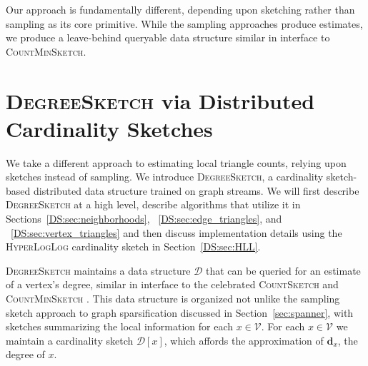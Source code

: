 \documentclass[10]{report}
\newcommand{\algoname}[1]{\textnormal{\textsc{#1}}}
\begin{document}
Our approach is fundamentally different, depending upon sketching rather than sampling as its core primitive. 
While the sampling approaches produce estimates, we produce a leave-behind queryable data structure similar in interface to \algoname{CountMinSketch}.


\section{\algoname{DegreeSketch} via Distributed Cardinality Sketches}
 \label{DS:sec:DS}

We take a different approach to estimating local triangle counts, relying upon sketches instead of sampling.
We introduce \algoname{DegreeSketch}, a cardinality sketch-based distributed data structure trained on graph streams.
We will first describe \algoname{DegreeSketch} at a high level, describe algorithms that utilize it in Sections~\ref{DS:sec:neighborhoods}, ~\ref{DS:sec:edge_triangles}, and ~\ref{DS:sec:vertex_triangles} and then discuss implementation details using the \algoname{HyperLogLog} cardinality sketch in Section~\ref{DS:sec:HLL}.

\algoname{DegreeSketch} maintains a data structure $\mathcal{D}$ that can be queried for an estimate of a vertex's degree, similar in interface to the celebrated \algoname{CountSketch} \cite{charikar2002finding} and \algoname{CountMinSketch} \cite{cormode2005improved}.
This data structure is organized not unlike the sampling sketch approach to graph sparsification discussed in Section~\ref{sec:spanner}, with sketches summarizing the local information for each $x \in \mathcal{V}$.
For each $x \in \mathcal{V}$ we maintain a cardinality sketch $\mathcal{D}[x]$, which affords the approximation of $\mathbf{d}_x$, the degree of $x$. 
\end{document}
